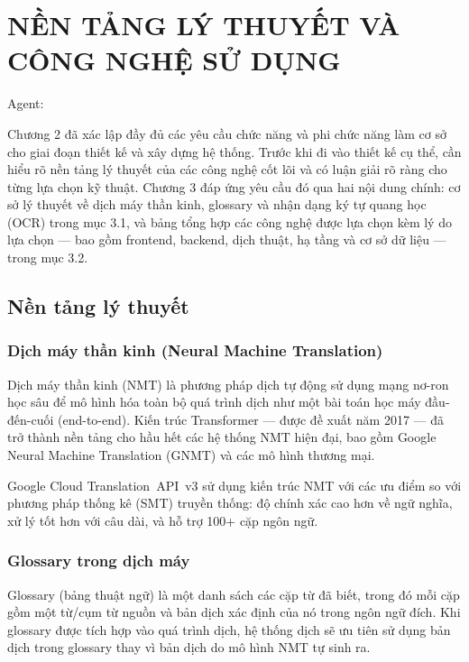 \chapter{NỀN TẢNG LÝ THUYẾT VÀ CÔNG NGHỆ SỬ DỤNG}

Agent:

Chương 2 đã xác lập đầy đủ các yêu cầu chức năng và phi chức năng làm cơ sở cho giai đoạn thiết kế và xây dựng hệ thống. Trước khi đi vào thiết kế cụ thể, cần hiểu rõ nền tảng lý thuyết của các công nghệ cốt lõi và có luận giải rõ ràng cho từng lựa chọn kỹ thuật. Chương 3 đáp ứng yêu cầu đó qua hai nội dung chính: cơ sở lý thuyết về dịch máy thần kinh, glossary và nhận dạng ký tự quang học (OCR) trong mục 3.1, và bảng tổng hợp các công nghệ được lựa chọn kèm lý do lựa chọn --- bao gồm frontend, backend, dịch thuật, hạ tầng và cơ sở dữ liệu --- trong mục 3.2.

\section{Nền tảng lý thuyết}

\subsection{Dịch máy thần kinh (Neural Machine Translation)}

Dịch máy thần kinh (NMT) là phương pháp dịch tự động sử dụng mạng nơ-ron học sâu để mô hình hóa
toàn bộ quá trình dịch như một bài toán học máy đầu-đến-cuối (end-to-end). Kiến trúc Transformer
\cite{vaswani2017attention} --- được đề xuất năm 2017 --- đã trở thành nền tảng cho hầu hết các
hệ thống NMT hiện đại, bao gồm Google Neural Machine Translation (GNMT) và các mô hình thương
mại.

Google Cloud Translation~API~v3 sử dụng kiến trúc NMT với các ưu điểm so với phương pháp thống
kê (SMT) truyền thống: độ chính xác cao hơn về ngữ nghĩa, xử lý tốt hơn với câu dài, và hỗ trợ
100+ cặp ngôn ngữ.

\subsection{Glossary trong dịch máy}

Glossary (bảng thuật ngữ) là một danh sách các cặp từ đã biết, trong đó mỗi cặp gồm một từ/cụm
từ nguồn và bản dịch xác định của nó trong ngôn ngữ đích. Khi glossary được tích hợp vào quá
trình dịch, hệ thống dịch sẽ ưu tiên sử dụng bản dịch trong glossary thay vì bản dịch do mô
hình NMT tự sinh ra.

